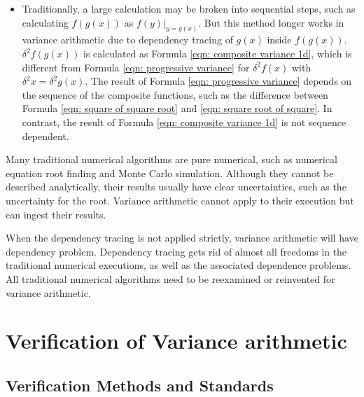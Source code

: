 \documentclass[twoside]{article}
\numberwithin{equation}{section}
\begin{document}
\begin{itemize}
\item
Traditionally, a large calculation may be broken into sequential steps, such as calculating $f(g(x))$ as $f(y)|_{y = g(x)}$.
But this method longer works in variance arithmetic due to dependency tracing of $g(x)$ inside $f(g(x))$. 
$\delta^2 f(g(x))$ is calculated as Formula \eqref{eqn: composite variance 1d}, which is different from Formula \eqref{eqn: progressive variance} for $\delta^2 f(x)$ with $\delta^2 x = \delta^2 g(x)$.
The result of Formula \eqref{eqn: progressive variance} depends on the sequence of the composite functions, such as  the difference between Formula \eqref{eqn: square of square root} and \eqref{eqn: square root of square}.
In contrast, the result of Formula \eqref{eqn: composite variance 1d} is not sequence dependent.

\end{itemize}

Many traditional numerical algorithms are pure numerical, such as numerical equation root finding and Monte Carlo simulation.
Although they cannot be described analytically, their results usually have clear uncertainties, such as the uncertainty for the root.
Variance arithmetic cannot apply to their execution but can ingest their results.

When the dependency tracing is not applied strictly, variance arithmetic will have dependency problem.
Dependency tracing gets rid of almost all freedoms in the traditional numerical executions, as well as the associated dependence problems.
All traditional numerical algorithms need to be reexamined or reinvented for variance arithmetic.








\clearpage
\section{Verification of Variance arithmetic}
\label{sec: validation}

\subsection{Verification Methods and Standards}
\end{document}

